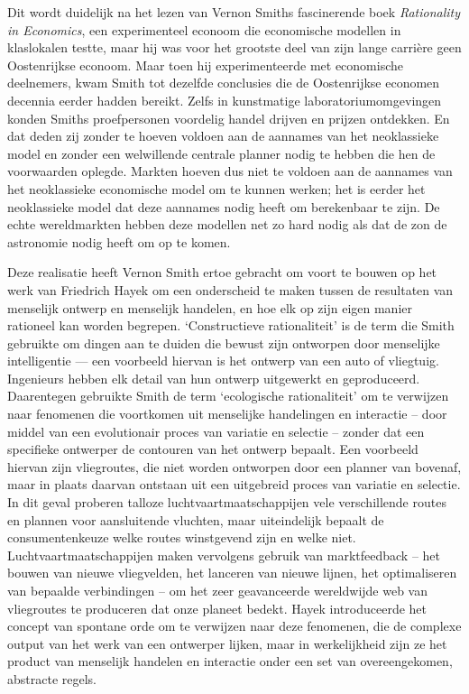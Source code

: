 Dit wordt duidelijk na het lezen van Vernon Smith\textquotesingle s fascinerende boek \emph{Rationality in Economics}, een experimenteel econoom die economische modellen in klaslokalen testte, maar hij was voor het grootste deel van zijn lange carrière geen Oostenrijkse econoom.\autocite{192} Maar toen hij experimenteerde met economische deelnemers, kwam Smith tot dezelfde conclusies die de Oostenrijkse economen decennia eerder hadden bereikt. Zelfs in kunstmatige laboratoriumomgevingen konden Smith\textquotesingle s proefpersonen voordelig handel drijven en prijzen ontdekken. En dat deden zij zonder te hoeven voldoen aan de aannames van het neoklassieke model en zonder een welwillende centrale planner nodig te hebben die hen de voorwaarden oplegde. Markten hoeven dus niet te voldoen aan de aannames van het neoklassieke economische model om te kunnen werken; het is eerder het neoklassieke model dat deze aannames nodig heeft om berekenbaar te zijn. De echte wereldmarkten hebben deze modellen net zo hard nodig als dat de zon de astronomie nodig heeft om op te komen.

Deze realisatie heeft Vernon Smith ertoe gebracht om voort te bouwen op het werk van Friedrich Hayek om een onderscheid te maken tussen de resultaten van menselijk ontwerp en menselijk handelen, en hoe elk op zijn eigen manier rationeel kan worden begrepen.\autocite{193} `Constructieve rationaliteit' is de term die Smith gebruikte om dingen aan te duiden die bewust zijn ontworpen door menselijke intelligentie --- een voorbeeld hiervan is het ontwerp van een auto of vliegtuig. Ingenieurs hebben elk detail van hun ontwerp uitgewerkt en geproduceerd. Daarentegen gebruikte Smith de term `ecologische rationaliteit' om te verwijzen naar fenomenen die voortkomen uit menselijke handelingen en interactie -- door middel van een evolutionair proces van variatie en selectie -- zonder dat een specifieke ontwerper de contouren van het ontwerp bepaalt. Een voorbeeld hiervan zijn vliegroutes, die niet worden ontworpen door een planner van bovenaf, maar in plaats daarvan ontstaan uit een uitgebreid proces van variatie en selectie. In dit geval proberen talloze luchtvaartmaatschappijen vele verschillende routes en plannen voor aansluitende vluchten, maar uiteindelijk bepaalt de consumentenkeuze welke routes winstgevend zijn en welke niet. Luchtvaartmaatschappijen maken vervolgens gebruik van marktfeedback -- het bouwen van nieuwe vliegvelden, het lanceren van nieuwe lijnen, het optimaliseren van bepaalde verbindingen -- om het zeer geavanceerde wereldwijde web van vliegroutes te produceren dat onze planeet bedekt. Hayek introduceerde het concept van spontane orde om te verwijzen naar deze fenomenen, die de complexe output van het werk van een ontwerper lijken, maar in werkelijkheid zijn ze het product van menselijk handelen en interactie onder een set van overeengekomen, abstracte regels.

